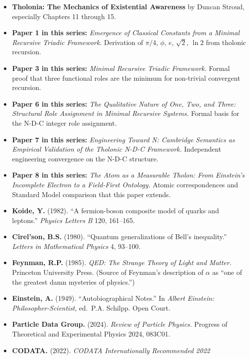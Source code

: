 \documentclass[
  11pt,
  letterpaper,
]{article}
\providecommand{\tightlist}{%
  \setlength{\itemsep}{0pt}\setlength{\parskip}{0pt}}
\begin{document}
\begin{itemize}
\tightlist
\item
  \textbf{Tholonia: The Mechanics of Existential Awareness} by Duncan
  Stroud, especially Chapters 11 through 15.
\item
  \textbf{Paper 1 in this series:} \emph{Emergence of Classical
  Constants from a Minimal Recursive Triadic Framework.} Derivation of
  \(\pi/4\), \(\phi\), \(e\), \(\sqrt{2}\), \(\ln 2\) from tholonic
  recursion.
\item
  \textbf{Paper 3 in this series:} \emph{Minimal Recursive Triadic
  Framework.} Formal proof that three functional roles are the minimum
  for non-trivial convergent recursion.
\item
  \textbf{Paper 6 in this series:} \emph{The Qualitative Nature of One,
  Two, and Three: Structural Role Assignment in Minimal Recursive
  Systems.} Formal basis for the N-D-C integer role assignment.
\item
  \textbf{Paper 7 in this series:} \emph{Engineering Toward N: Cambridge
  Semantics as Empirical Validation of the Tholonic N-D-C Framework.}
  Independent engineering convergence on the N-D-C structure.
\item
  \textbf{Paper 8 in this series:} \emph{The Atom as a Measurable
  Tholon: From Einstein's Incomplete Electron to a Field-First
  Ontology.} Atomic correspondences and Standard Model comparison that
  this paper extends.
\item
  \textbf{Koide, Y.} (1982). ``A fermion-boson composite model of quarks
  and leptons.'' \emph{Physics Letters B} 120, 161--165.
\item
  \textbf{Cirel'son, B.S.} (1980). ``Quantum generalizations of Bell's
  inequality.'' \emph{Letters in Mathematical Physics} 4, 93--100.
\item
  \textbf{Feynman, R.P.} (1985). \emph{QED: The Strange Theory of Light
  and Matter.} Princeton University Press. (Source of Feynman's
  description of \(\alpha\) as ``one of the greatest damn mysteries of
  physics.'')
\item
  \textbf{Einstein, A.} (1949). ``Autobiographical Notes.'' In
  \emph{Albert Einstein: Philosopher-Scientist}, ed.~P.A. Schilpp. Open
  Court.
\item
  \textbf{Particle Data Group.} (2024). \emph{Review of Particle
  Physics.} Progress of Theoretical and Experimental Physics 2024,
  083C01.
\item
  \textbf{CODATA.} (2022). \emph{CODATA Internationally Recommended 2022
}
\end{itemize}
\end{document}
